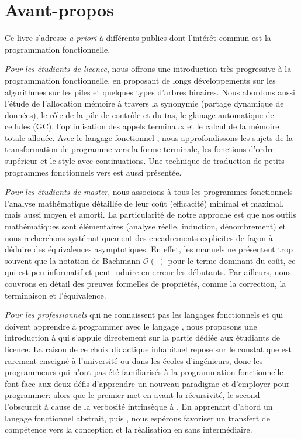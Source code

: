 
\chapter*{Avant-propos}
\thispagestyle{empty}

Ce livre s'adresse \emph{a priori} à différents publics dont l'intérêt
commun est la programmation fonctionnelle.

\emph{Pour les étudiants de licence}, nous offrons une introduction très progressive à la programmation fonctionnelle, en proposant de longs développements sur les algorithmes sur les piles et quelques types d'arbres binaires. Nous abordons aussi l'étude de l'allocation mémoire à travers la synonymie (partage dynamique de données), le rôle de la pile de contrôle et du tas, le glanage automatique de cellules (GC), l'optimisation des appels terminaux et le calcul de la mémoire totale allouée. Avec le langage fonctionnel \Erlang, nous approfondissons les sujets de la transformation de programme vers la forme terminale, les fonctions d'ordre supérieur et le style avec continuations. Une technique de traduction de petits programmes fonctionnels vers \Java est aussi présentée.

\emph{Pour les étudiants de master}, nous associons à tous les programmes fonctionnels l'analyse mathématique détaillée de leur coût (efficacité) minimal et maximal, mais aussi moyen et amorti. La particularité de notre approche est que nos outils mathématiques sont élémentaires (analyse réelle, induction, dénombrement) et nous recherchons systématiquement des encadrements explicites de façon à déduire des équivalences asymptotiques. En effet, les manuels ne présentent trop souvent que la notation de Bachmann \(\mathcal{O}(\cdot)\) pour le terme dominant du coût, ce qui est peu informatif et peut induire en erreur les débutants. Par ailleurs, nous couvrons en détail des preuves formelles de propriétés, comme la correction, la terminaison et l'équivalence.

\emph{Pour les professionnels} qui ne connaissent pas les langages fonctionnels et qui doivent apprendre à programmer avec le langage \XSLT, nous proposons une introduction à \XSLT qui s'appuie directement sur la partie dédiée aux étudiants de licence. La raison de ce choix didactique inhabituel repose sur le constat que \XSLT est rarement enseigné à l'université ou dans les écoles d'ingénieurs, donc les programmeurs qui n'ont pas été familiarisés à la programmation fonctionnelle font face aux deux défis d'apprendre un nouveau paradigme et d'employer \XML pour programmer: alors que le premier met en avant la récursivité, le second l'obscurcit à cause de la verbosité intrinsèque à \XML. En apprenant d'abord un langage fonctionnel abstrait, puis \XML, nous espérons favoriser un transfert de compétence vers la conception et la réalisation en \XSLT sans intermédiaire.

